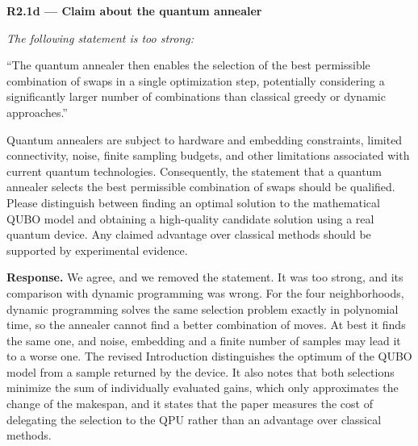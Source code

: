\documentclass[12pt]{article}
\newenvironment{rc}[1]{\par\medskip\noindent\textbf{#1}\par\nopagebreak\noindent\itshape\renewcommand{\emph}[1]{\textbf{##1}}\ignorespaces}{\par}
\newcommand{\answer}[1]{\par\smallskip\noindent\textbf{Response.} #1\par}
\begin{document}
\begin{rc}{R2.1d --- Claim about the quantum annealer}
The following statement is too strong:

``The quantum annealer then enables the selection of the best permissible combination of swaps in a single optimization step, potentially considering a significantly larger number of combinations than classical greedy or dynamic approaches.''

Quantum annealers are subject to hardware and embedding constraints, limited connectivity, noise, finite sampling budgets, and other limitations associated with current quantum technologies. Consequently, the statement that a quantum annealer selects the best permissible combination of swaps should be qualified. Please distinguish between finding an optimal solution to the mathematical QUBO model and obtaining a high-quality candidate solution using a real quantum device. Any claimed advantage over classical methods should be supported by experimental evidence.
\end{rc}
\answer{We agree, and we removed the statement. It was too strong, and its comparison with dynamic programming was wrong. For the four neighborhoods, dynamic programming solves the same selection problem exactly in polynomial time, so the annealer cannot find a better combination of moves. At best it finds the same one, and noise, embedding and a finite number of samples may lead it to a worse one. The revised Introduction distinguishes the optimum of the QUBO model from a sample returned by the device. It also notes that both selections minimize the sum of individually evaluated gains, which only approximates the change of the makespan, and it states that the paper measures the cost of delegating the selection to the QPU rather than an advantage over classical methods.}
\end{document}
